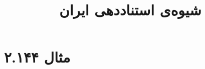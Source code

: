 \documentclass[a4paper,10pt]{article}
\begin{document}
\title{شیوه‌ی استناددهی ایران}
\author{}
\date{}
\maketitle



\section*{مثال ۲.۱۴۴}

\cite{لامبرت}\\
\\
\\






\end{document}

